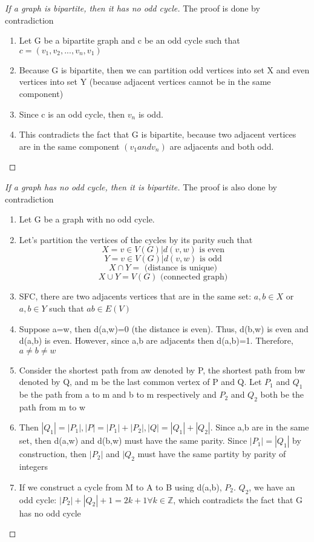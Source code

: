 \documentclass{article}
\begin{document}
\begin{proof}[If a graph is bipartite, then it has no odd cycle]
    The proof is done by contradiction
    \begin{enumerate}
	\item Let G be a bipartite graph and c be an odd cycle such that
	    $ c=(v_1, v_2, ..., v_n, v_1)$
	\item Because G is bipartite, then we can partition odd vertices
	    into set X and even vertices into set Y (because adjacent
	    vertices cannot be in the same component)
	\item Since c is an odd cycle, then $v_n$ is odd.
	\item This contradicts the fact that G is bipartite, because two
	    adjacent vertices are in the same component $(v_1 and v_n)$
	    are adjacents and both odd.
    \end{enumerate}
\end{proof}

\begin{proof}[If a graph has no odd cycle, then it is bipartite]
    The proof is also done by contradiction
    \begin{enumerate}
	\item Let G be a graph with no odd cycle.
	\item Let's partition the vertices of the cycles by its parity
	    such that $$ X = {v \in V(G) | d(v,w) \text{ is even }} $$
	    $$ Y = {v \in V(G) | d(v,w) \text{ is odd }} $$
	    $$ X \cap Y = {} \text{ (distance is unique) }$$
	    $$ X \cup Y = V(G) \text{ (connected graph) }$$
	\item SFC, there are two adjacents vertices that are in the same
	    set: $a,b \in X$ or $a,b \in Y$ such that $ab \in E(V) $
	\item Suppose a=w, then d(a,w)=0 (the distance is even). Thus, d(b,w)
	    is even and d(a,b) is even. However, since a,b are adjacents
	    then d(a,b)=1. Therefore, $a \neq b \neq w$
	\item Consider the shortest path from aw denoted by P, the
	    shortest path from bw denoted by Q, and m be the last
	    common vertex of P and Q. Let $P_1$ and $Q_1$ be the path from
	    a to m and b to m respectively and $P_2$ and $Q_2$ both be the
	    path from m to w
	\item Then $|Q_1| = |P_1|, |P|=|P_1|+|P_2|, |Q|=|Q_1|+|Q_2|$. Since
	    a,b are in the same set, then d(a,w) and d(b,w) must have the
	    same parity. Since $|P_1|=|Q_1|$ by construction, then
	    $|P_2|$ and $|Q_2$ must have the same partity by parity of
	    integers
	\item If we construct a cycle from M to A to B using d(a,b),
	    $P_2$. $Q_2$, we have an odd cycle: $|P_2|+|Q_2|+1=2k+1 \forall
	    k \in \mathbb{Z}$, which contradicts the fact that G has no
	    odd cycle
    \end{enumerate}
\end{proof}
\end{document}
